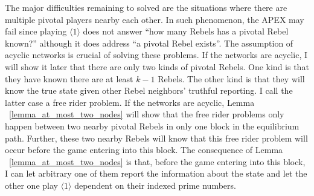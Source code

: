\documentclass[12pt,letter]{article}
\theoremstyle{definition}
\theoremstyle{remark}
\theoremstyle{claim}
\begin{document}
The major difficulties remaining to solved are the situations where there are multiple pivotal players nearby each other. In such phenomenon, the APEX may fail since playing $\langle 1 \rangle$ does not answer ``how many Rebels has a pivotal Rebel known?'' although it does address ``a pivotal Rebel exists''. The assumption of acyclic networks is crucial of solving these problems. If the networks are acyclic, I will show it later that there are only two kinds of pivotal Rebels. One kind is that they have known there are at least $k-1$ Rebels. The other kind is that they will know the true state given other Rebel neighbors' truthful reporting. I call the latter case a free rider problem. If the networks are acyclic, Lemma ~\ref{lemma_at_most_two_nodes} will show that the free rider problems only happen between two nearby pivotal Rebels in only one block in the equilibrium path. Further, these two nearby Rebels will know that this free rider problem will occur before the game entering into this block. The consequence of Lemma ~\ref{lemma_at_most_two_nodes} is that, before the game entering into this block, I can let arbitrary one of them report the information about the state and let the other one play $\langle 1 \rangle$ dependent on their indexed prime numbers.
\end{document}
